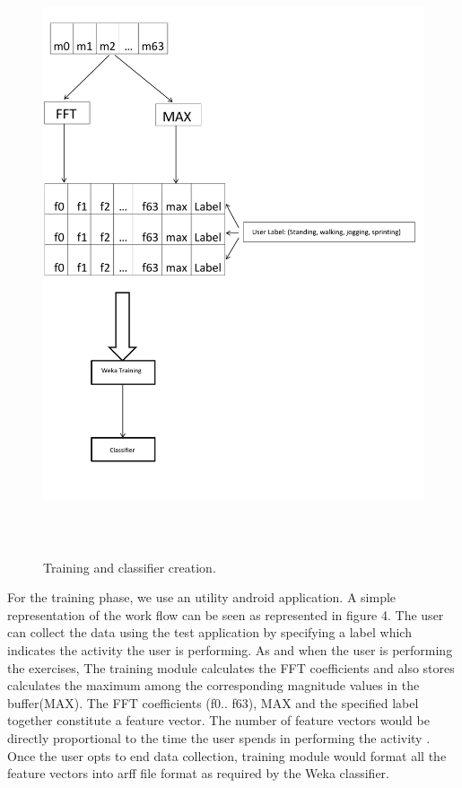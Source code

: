 \documentclass[conference]{IEEEtran}
\begin{document}
\begin{figure}
\centering
  \includegraphics[width=5in,height= 7in]{magnitude_to_feature_vector.pdf}
  \caption{Training and classifier creation. }
\end{figure}

For the training phase, we use an utility android application. A simple representation of the work flow can be seen as represented in figure 4. The user can collect the data using the test application by specifying a label which indicates the activity the user is performing. As and when the user is performing the exercises, The training module calculates the FFT coefficients and also stores calculates the maximum among the corresponding magnitude values in the buffer(MAX). The FFT coefficients (f0.. f63), MAX and the specified label together constitute a feature vector. The number of feature vectors would be directly proportional to the time the user spends in performing the activity . Once the user opts to end data collection, training module would format all the feature vectors into arff file format as required by the Weka classifier.
\end{document}
